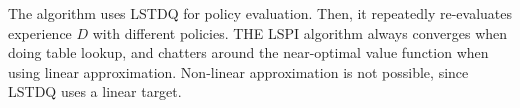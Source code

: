 The algorithm uses LSTDQ for policy evaluation. Then, it repeatedly re-evaluates experience $D$ with different policies. THE LSPI algorithm always converges when doing table lookup, and chatters around the near-optimal value function when using linear approximation. Non-linear approximation is not possible, since LSTDQ uses a linear target.